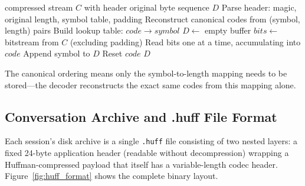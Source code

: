\documentclass[conference]{IEEEtran}
\begin{document}
\begin{algorithm}[h]
\caption{Canonical Huffman Decoding}
\label{alg:huffman_decode}
\begin{algorithmic}[1]
\REQUIRE compressed stream $C$ with header
\ENSURE original byte sequence $D$
\STATE Parse header: magic, original length, symbol table, padding
\STATE Reconstruct canonical codes from (symbol, length) pairs
\STATE Build lookup table: $code \rightarrow symbol$
\STATE $D \leftarrow$ empty buffer
\STATE $bits \leftarrow$ bitstream from $C$ (excluding padding)
  \STATE Read bits one at a time, accumulating into $code$
    \STATE Append symbol to $D$
    \STATE Reset $code$
  \ENDIF
\ENDWHILE
\RETURN $D$
\end{algorithmic}
\end{algorithm}

The canonical ordering means only the symbol-to-length mapping needs to be stored---the decoder reconstructs the exact same codes from this mapping alone.

\subsection{Conversation Archive and .huff File Format}

Each session's disk archive is a single \texttt{.huff} file consisting of two nested layers: a fixed 24-byte application header (readable without decompression) wrapping a Huffman-compressed payload that itself has a variable-length codec header. Figure~\ref{fig:huff_format} shows the complete binary layout.
\end{document}
